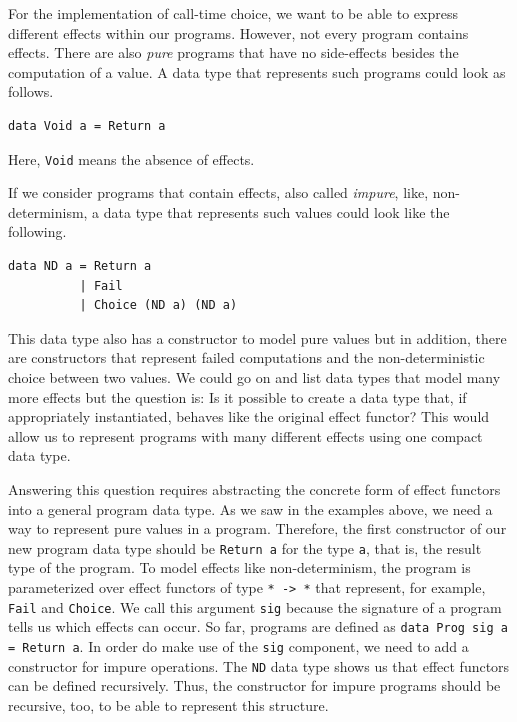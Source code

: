 \documentclass[a4paper, 11pt, fleqn, twoside]{scrreprt}
\newcommand{\hinl}[1]{\texttt{#1}}
\begin{document}
For the implementation of call-time choice, we want to be able to express different effects within our programs.
However, not every program contains effects.
There are also \textit{pure} programs that have no side-effects besides the computation of a value.
A data type that represents such programs could look as follows.

\begin{verbatim}
data Void a = Return a
\end{verbatim}

Here, \hinl{Void} means the absence of effects.

If we consider programs that contain effects, also called \textit{impure}, like, non-determinism, a data type that represents such values could look like the following.

\begin{verbatim}
data ND a = Return a
          | Fail
          | Choice (ND a) (ND a)
\end{verbatim}

This data type also has a constructor to model pure values but in addition, there are constructors that represent failed computations and the non-deterministic choice between two values.
We could go on and list data types that model many more effects but the question is: Is it possible to create a data type that, if appropriately instantiated, behaves like the original effect functor?
This would allow us to represent programs with many different effects using one compact data type.

Answering this question requires abstracting the concrete form of effect functors into a general program data type.
As we saw in the examples above, we need a way to represent pure values in a program.
Therefore, the first constructor of our new program data type should be \hinl{Return a} for the type \hinl{a}, that is, the result type of the program.
To model effects like non-determinism, the program is parameterized over effect functors of type \hinl{* -> *} that represent, for example, \hinl{Fail} and \hinl{Choice}.
We call this argument \hinl{sig} because the signature of a program tells us which effects can occur.
So far, programs are defined as \hinl{data Prog sig a = Return a}.
In order do make use of the \hinl{sig} component, we need to add a constructor for impure operations.
The \hinl{ND} data type shows us that effect functors can be defined recursively.
Thus, the constructor for impure programs should be recursive, too, to be able to represent this structure.
\end{document}
